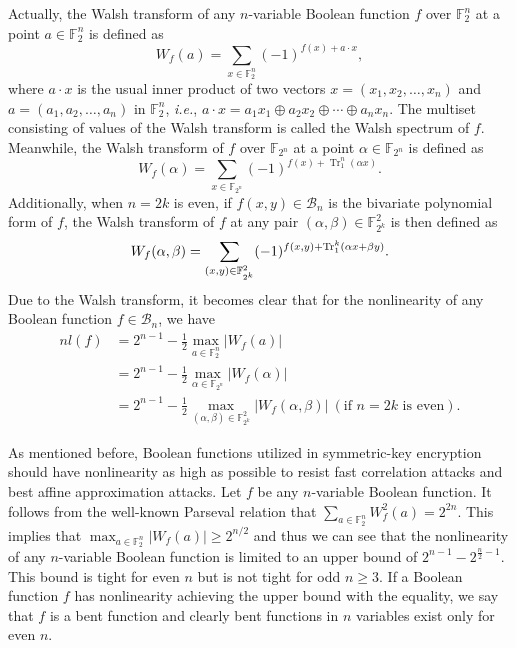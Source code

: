 \documentclass[preprint,10pt]{elsarticle}
\newcommand{\F}{\mathbb{F}}
\newcommand{\0}{\textbf{0}}
\newcommand{\1}{\textbf{1}}
\newcommand{\TrN}{\operatorname{Tr}_1^n}
\theoremstyle{plain}
\begin{document}
    Actually, the Walsh transform of any $n$-variable Boolean function $f$ over $\F_2^n$ at a point $a\in\F_2^n$ is defined as
    \[W_f(a)=\sum_{x\in\F_2^n}(-1)^{f(x)+a\cdot x},\]
    where $a\cdot x$ is the usual inner product of two vectors $x=(x_1,x_2,\dots,x_n)$ and $a=(a_1,a_2,\dots,a_n)$ in $\F_2^n$, \emph{i.e.}, $a\cdot x=a_1x_1\oplus a_2x_2\oplus\cdots\oplus a_nx_n$.
    The multiset consisting of values of the Walsh transform is called the Walsh spectrum of $f$.
    Meanwhile, the Walsh transform of $f$ over $\F_{2^n}$ at a point $\alpha\in\F_{2^n}$ is defined as
    \[W_f(\alpha)=\sum_{x\in\F_{2^n}}(-1)^{f(x)+\TrN(\alpha x)}.\]
    Additionally, when $n=2k$ is even, if $f(x,y)\in\mathcal{B}_n$ is the bivariate polynomial form of $f$, the Walsh transform of $f$ at any pair $(\alpha,\beta)\in\F_{2^k}^2$ is then defined as
    \[W_f(\alpha,\beta)=\sum_{(x,y)\in\F_{2^k}^2}(-1)^{f(x,y)+\Tr_1^k(\alpha x+\beta y)}.\]
    Due to the Walsh transform, it becomes clear that for the nonlinearity of any Boolean function $f\in \mathcal{B}_n$, we have 
    \begin{align*}
        nl(f) &= 2^{n-1} - \frac{1}{2}\max_{a\in\F_2^n}|W_f(a)|\\
              &= 2^{n-1} - \frac{1}{2}\max_{\alpha\in\F_{2^n}}|W_f(\alpha)|\\
              &= 2^{n-1} - \frac{1}{2}\max_{(\alpha,\beta)\in\F_{2^k}^2}|W_f(\alpha,\beta)|~(\text{if }n=2k\text{ is even}).
    \end{align*}

    As mentioned before, Boolean functions utilized in symmetric-key encryption should have nonlinearity as high as possible to resist fast correlation attacks and best affine approximation attacks.
    Let $f$ be any $n$-variable Boolean function. It follows from the well-known Parseval relation that $\sum_{a\in\F_2^n}W_f^2(a)=2^{2n}$.
    This implies that $\max_{a\in\F_2^n}\left\lvert W_f(a)\right\rvert \geq  2^{n/2}$ and thus we can see that
    the nonlinearity of any $n$-variable Boolean function is limited to an upper bound of $2^{n-1}-2^{\frac{n}{2}-1}$.
    This bound is tight for even $n$ but is not tight for odd $n\geq 3$.
    If a Boolean function $f$ has nonlinearity achieving the upper bound with the equality,
    we say that $f$ is a bent function and clearly bent functions in $n$ variables exist only for even $n$.
\end{document}
